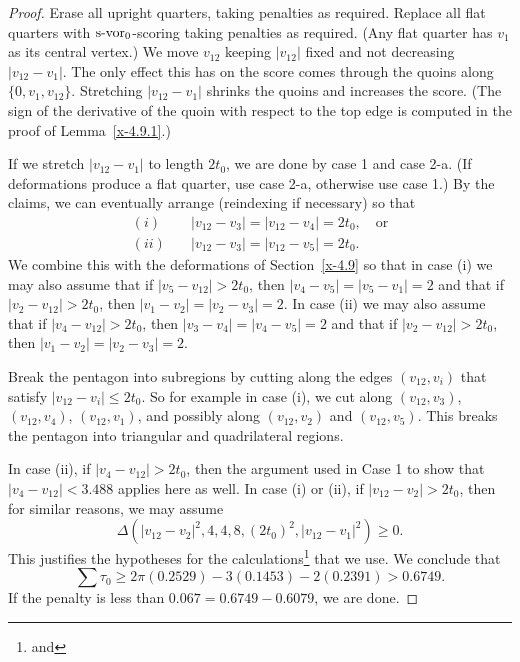 \begin{proof}
Erase all upright quarters, taking penalties as required.  Replace
all flat quarters with $\operatorname{s-vor}_0$-scoring taking penalties as
required. (Any flat quarter has $v_1$ as its central vertex.) We
move $v_{12}$ keeping $|v_{12}|$ fixed and not decreasing
$|v_{12}-v_1|$.  The only effect this has on the score comes
through the quoins along $\{0,v_1,v_{12}\}$. Stretching
$|v_{12}-v_1|$ shrinks the quoins and increases the score. (The
sign of the derivative of the quoin with respect to the top edge
is computed in the proof of Lemma~\ref{x-4.9.1}.)

If we stretch $|v_{12}-v_1|$ to length $2t_0$, we are done by case
1 and case 2-a. (If deformations produce a flat quarter, use case
2-a, otherwise use case 1.) By the claims, we can eventually
arrange (reindexing if necessary) so that
$$
\begin{array}{lll}
(i)&\quad |v_{12}-v_3|=|v_{12}-v_4|=2t_0,\quad\text{or}\\
(ii)&\quad |v_{12}-v_3|=|v_{12}-v_5|=2t_0.
\end{array}
$$
We combine this with the deformations of Section~\ref{x-4.9} so
that in case (i) we may also assume that if $|v_5-v_{12}|>2t_0$,
then $|v_4-v_5|=|v_5-v_1|=2$ and that if $|v_2-v_{12}|>2t_0$, then
$|v_1-v_2|=|v_2-v_3|=2$. In case (ii) we may also assume that if
$|v_4-v_{12}|>2t_0$, then $|v_3-v_4|=|v_4-v_5|=2$ and that if
$|v_2-v_{12}|>2t_0$, then $|v_1-v_2|=|v_2-v_3|=2$.

Break the pentagon into subregions by cutting along the edges
$(v_{12},v_i)$ that satisfy $|v_{12}-v_i|\le2t_0$. So for example
in case (i), we cut along $(v_{12},v_3)$, $(v_{12},v_4)$,
$(v_{12},v_1)$, and possibly along $(v_{12},v_2)$ and
$(v_{12},v_5)$.  This breaks the pentagon into triangular and
quadrilateral regions.

In case (ii), if $|v_4-v_{12}|>2t_0$, then the argument used in
Case 1 to show that $|v_4-v_{12}|<3.488$ applies here as well. In
case (i) or (ii), if $|v_{12}-v_2|>2t_0$, then for similar
reasons, we may assume
    $$\Delta(|v_{12}-v_2|^2,4,4,8,(2t_0)^2,|v_{12}-v_1|^2)\ge0.$$
This justifies the hypotheses for the
calculations\footnote{ and } that
we use. We conclude that
    $$\sum\tau_0 \ge 2\pi (0.2529) -3 (0.1453) -2 (0.2391) > 0.6749.$$
If the penalty is less than $0.067=0.6749-0.6079$, we are done.


\end{proof}

